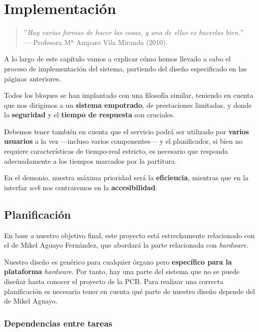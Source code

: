 \chapter{Implementación}
\label{cap: capitulo_5}

\begin{quote}
	\small \flushright ''\textit{Hay varias formas de hacer las cosas, y una de ellas es hacerlas bien.}'' \\
	--- Profesora Mª Amparo Vila Miranda (2010).
\end{quote}

A lo largo de este capítulo vamos a explicar cómo hemos llevado a cabo el proceso de implementación del sistema, partiendo del diseño especificado en las páginas anteriores.

Todos los bloques se han implantado con una filosofía similar, teniendo en cuenta que nos dirigimos a un \textbf{sistema empotrado}, de prestaciones limitadas, y donde la \textbf{seguridad} y el \textbf{tiempo de respuesta} son cruciales.

Debemos tener también en cuenta que el servicio podrá ser utilizado por \textbf{varios usuarios} a la vez ---incluso varios componentes--- y el planificador, si bien no requiere características de tiempo-real estricto, es necesario que responda adecuadamente a los tiempos marcados por la partitura.

En el demonio, nuestra máxima prioridad será la \textbf{eficiencia}, mientras que en la interfaz \textit{web} nos centraremos en la \textbf{accesibilidad}.

\newpage

\section{Planificación}

En base a nuestro objetivo final, este proyecto está estrechamente relacionado con el de Mikel Aguayo Fernández, que abordará la parte relacionada con \textit{hardware}.

Nuestro diseño es genérico para cualquier órgano pero \textbf{específico para la plataforma} \textit{hardware}. Por tanto, hay una parte del sistema que no se puede diseñar hasta conocer el proyecto de la \acrshort{PCB}. Para realizar una correcta planificación es necesario tener en cuenta qué parte de nuestro diseño depende del de Mikel Aguayo.

\subsection{Dependencias entre tareas}

